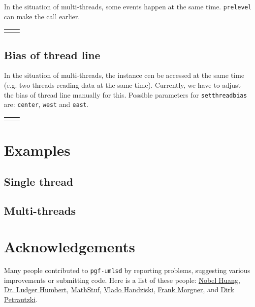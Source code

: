 \documentclass{article}
\newcommand{\demo}[2][1]{
  \begin{center}
  \begin{tabular}{cc}
    \begin{minipage}{.49\linewidth}
      \centering
      \resizebox{#1\linewidth}{!}{
        
      }
    \end{minipage}
    &
    \begin{minipage}{.45\linewidth}
      
    \end{minipage}
  \end{tabular}
  \end{center}
}
\newcommand{\example}[2][1]{
  \begin{center}  
    \resizebox{#1\linewidth}{!}{
      
    }
  \end{center}
  
}
\begin{document}
In the situation of multi-threads, some events happen at the same
time. \texttt{prelevel} can make the call earlier.

\demo[0.6]{prelevel}

\subsection{Bias of thread line}
In the situation of multi-threads, the instance cen be accessed at the
same time (e.g. two threads reading data at the same time). Currently,
we have to adjust the bias of thread line manually for this. Possible
parameters for \texttt{setthreadbias} are: \texttt{center},
\texttt{west} and \texttt{east}.

\demo[0.8]{threadbias}

\section{Examples}
\subsection{Single thread}
\example[0.8]{single-thread-example}

\subsection{Multi-threads}
\example[0.8]{multi-threads-example}

\section{Acknowledgements}
Many people contributed to \texttt{pgf-umlsd} by reporting problems,
suggesting various improvements or submitting code. Here is a list of
these people:
\href{mailto:nobel1984@gmail.com}{Nobel Huang},
\href{mailto:humbert@uni-wuppertal.de}{Dr. Ludger Humbert},
\href{mailto:MathStuf@gmail.com}{MathStuf},
\href{mailto:vlado.handziski@gmail.com}{Vlado Handziski},
\href{mailto:frankmorgner@gmail.com}{Frank Morgner},
and \href{mailto:petrautzki@hs-coburg.de}{Dirk Petrautzki}.
\end{document}

